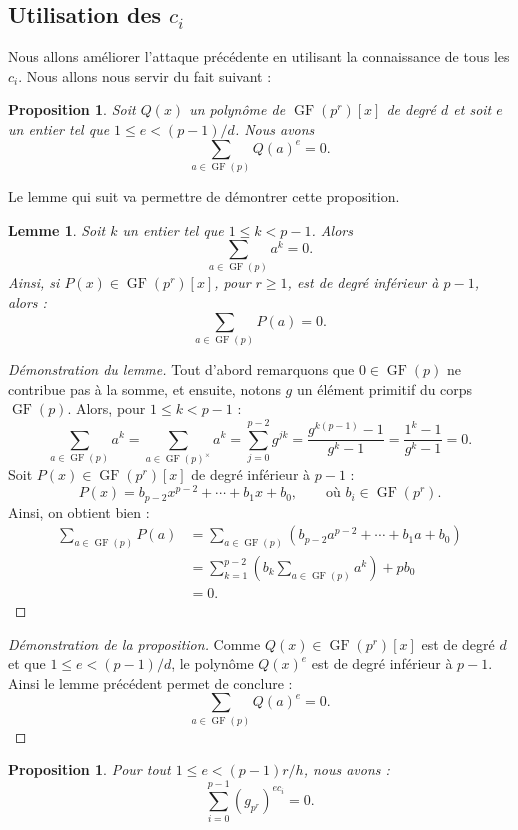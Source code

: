 \documentclass[a4paper, titlepage, 11pt]{article}
\newtheorem{lemm}[theo]{Lemme}
\newtheorem{prop}[theo]{Proposition}
\theoremstyle{definition}
\theoremstyle{remark}
\def\gf{\operatorname{GF}}
\begin{document}
\subsection{Utilisation des $c_i$}

Nous allons améliorer l'attaque précédente en utilisant la connaissance de tous les $c_i$. Nous allons nous servir du fait suivant :

\begin{prop}
Soit $Q(x)$ un polynôme de $\gf(p^r)[x]$ de degré $d$ et soit $e$ un entier tel que $1 \leqslant e < (p-1)/d$. Nous avons $$\sum_{a \in \gf(p)} Q(a)^e = 0.$$
\end{prop}

Le lemme qui suit va permettre de démontrer cette proposition.

\begin{lemm}
Soit $k$ un entier tel que $1 \leqslant k < p-1$. Alors
$$\sum_{a\in\gf(p)} a^k = 0.$$
Ainsi, si $P(x) \in \gf(p^r)[x]$, pour $r \geqslant 1$, est de degré inférieur à $p-1$, alors : $$\sum_{a\in\gf(p)} P(a) = 0.$$
\end{lemm}

\begin{proof}[Démonstration du lemme]
Tout d'abord remarquons que $0 \in \gf(p)$ ne contribue pas à la somme, et ensuite, notons $g$ un élément primitif du corps $\gf(p)$. Alors, pour $1 \leqslant k < p-1$ :
$$\sum_{a\in\gf(p)} a^k = \sum_{a\in\gf(p)^\times} a^k = \sum_{j=0}^{p-2} g^{jk} = \frac{g^{k(p-1)} - 1}{g^{k} - 1} = \frac{1^{k} - 1}{g^{k} - 1} = 0.$$
Soit $P(x) \in \gf(p^r)[x]$ de degré inférieur à $p-1$ :
$$P(x) = b_{p-2}x^{p-2} + \cdots + b_1x + b_0, \qquad \text{où }b_i \in \gf(p^r).$$
Ainsi, on obtient bien :
\begin{align*}
\sum_{a\in\gf(p)} P(a) &= \sum_{a\in\gf(p)} \left({b_{p-2}a^{p-2} + \cdots + b_1a + b_0}\right) \\
&= \sum_{k=1}^{p-2} \left({ b_k\sum_{a\in\gf(p)} a^k}\right) + pb_0 \\
&= 0.
\end{align*}
\end{proof}

\begin{proof}[Démonstration de la proposition]
Comme $Q(x) \in \gf(p^r)[x]$ est de degré $d$ et que $1\leqslant e < (p-1)/d$, le polynôme $Q(x)^e$ est de degré inférieur à $p-1$. Ainsi le lemme précédent permet de conclure :
$$\sum_{a\in\gf(p)} Q(a)^e = 0.$$
\end{proof}

\begin{prop}
Pour tout $1 \leqslant e < (p-1)r/h$, nous avons :
$$\sum_{i=0}^{p-1} (g_{p^r})^{ec_i} = 0.$$
\end{prop}
\end{document}
